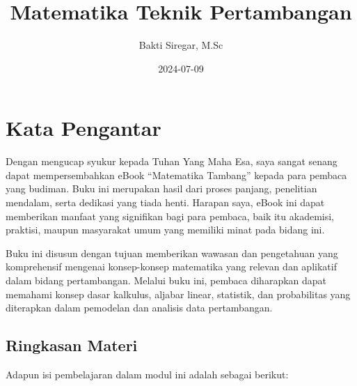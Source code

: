 \documentclass[
]{book}
\title{Matematika Teknik Pertambangan}
\author{Bakti Siregar, M.Sc}
\date{2024-07-09}
\begin{document}
\maketitle

{
\setcounter{tocdepth}{1}
\tableofcontents
}
\chapter*{Kata Pengantar}\label{kata-pengantar}

Dengan mengucap syukur kepada Tuhan Yang Maha Esa, saya sangat senang dapat mempersembahkan eBook ``Matematika Tambang'' kepada para pembaca yang budiman. Buku ini merupakan hasil dari proses panjang, penelitian mendalam, serta dedikasi yang tiada henti. Harapan saya, eBook ini dapat memberikan manfaat yang signifikan bagi para pembaca, baik itu akademisi, praktisi, maupun masyarakat umum yang memiliki minat pada bidang ini.

Buku ini disusun dengan tujuan memberikan wawasan dan pengetahuan yang komprehensif mengenai konsep-konsep matematika yang relevan dan aplikatif dalam bidang pertambangan. Melalui buku ini, pembaca diharapkan dapat memahami konsep dasar kalkulus, aljabar linear, statistik, dan probabilitas yang diterapkan dalam pemodelan dan analisis data pertambangan.

\section*{Ringkasan Materi}\label{ringkasan-materi}

Adapun isi pembelajaran dalam modul ini adalah sebagai berikut:
\end{document}
